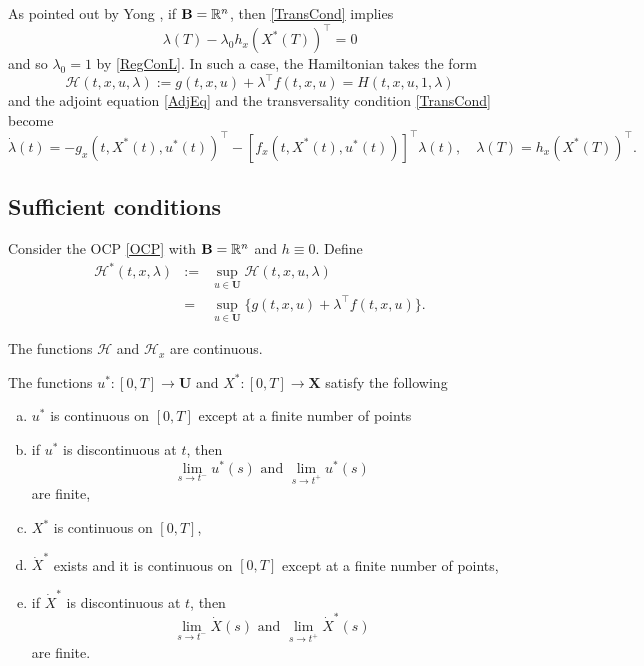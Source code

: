 \begin{remark}\label{RemNoCons}\rm
As pointed out by Yong \cite[p. 43]{Yong2015}, if $\mathbf{B}=\mathbb{R}^n$, then \eqref{TransCond} implies 
  \[\lambda(T)-\lambda_0h_x(X^\ast(T))^\top=0\]
  and so $\lambda_0=1$ by \eqref{RegConL}. In such a case, the Hamiltonian takes the form  
      \[\mathcal{H}(t,x,u,\lambda):= g(t,x,u) + \lambda^\top f(t,x,u) = H(t,x,u,1,\lambda)  \]  
    and the adjoint equation \eqref{AdjEq} and the transversality condition \eqref{TransCond} become 
    \[    \dot{\lambda}(t) = -g_x(t,X^\ast(t),u^\ast(t))^\top -  [f_x(t,X^\ast(t),u^\ast(t))]^\top \lambda(t), \quad \lambda(T)=h_x(X^\ast(T))^\top.
  \]
  \end{remark}
 


\subsection{Sufficient conditions}


Consider the OCP \eqref{OCP} with $\mathbf{B}=\mathbb{R}^n$ and $h\equiv 0$. Define
\begin{eqnarray*}
\mathcal{H}^\ast(t,x,\lambda) & := & \sup_{u\in\mathbf{U}}\mathcal{H}(t,x,u,\lambda)\\
     & = & \sup_{u\in\mathbf{U}}\{g(t,x,u) + \lambda^\top f(t,x,u)\}.    
\end{eqnarray*}

\begin{assumption}\label{ConcavityH}\rm The functions $\mathcal{H}$ and $\mathcal{H}_x$ are continuous. 
\end{assumption}

\begin{assumption}\label{piecewise}\rm The functions $u^\ast:[0,T]\to\mathbf{U}$ and $X^\ast:[0,T]\to\mathbf{X}$ satisfy the following
\begin{enumerate}[(a)]
    \item $u^\ast$ is continuous on $[0,T]$ except at a finite number of points 
    \item if $u^\ast$ is discontinuous at $t$, then  
        \[\lim_{s\to t^-}u^\ast(s) \mbox{ and } \lim_{s\to t^+}u^\ast(s)\]
        are finite,
    \item $X^\ast$ is continuous on $[0,T]$, 
    \item $\dot{X}^\ast$ exists and it is continuous on $[0,T]$ except at a finite number of points,
    \item  if $\dot{X}^\ast$ is discontinuous at $t$, then  
        \[\lim_{s\to t^-}\dot{X}(s) \mbox{ and } \lim_{s\to t^+}\dot{X}^\ast(s)\]
        are finite. 
\end{enumerate}
\end{assumption}


